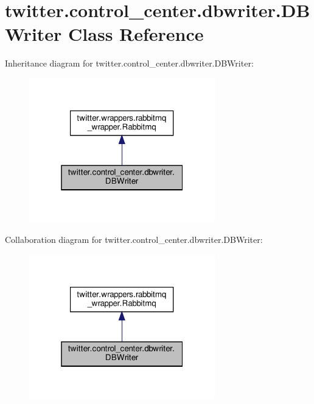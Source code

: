 \hypertarget{classtwitter_1_1control__center_1_1dbwriter_1_1DBWriter}{}\section{twitter.\+control\+\_\+center.\+dbwriter.\+D\+B\+Writer Class Reference}
\label{classtwitter_1_1control__center_1_1dbwriter_1_1DBWriter}


Inheritance diagram for twitter.\+control\+\_\+center.\+dbwriter.\+D\+B\+Writer\+:
\nopagebreak
\begin{figure}[H]
\begin{center}
\leavevmode
\includegraphics[width=229pt]{classtwitter_1_1control__center_1_1dbwriter_1_1DBWriter__inherit__graph}
\end{center}
\end{figure}


Collaboration diagram for twitter.\+control\+\_\+center.\+dbwriter.\+D\+B\+Writer\+:
\nopagebreak
\begin{figure}[H]
\begin{center}
\leavevmode
\includegraphics[width=229pt]{classtwitter_1_1control__center_1_1dbwriter_1_1DBWriter__coll__graph}
\end{center}
\end{figure}
